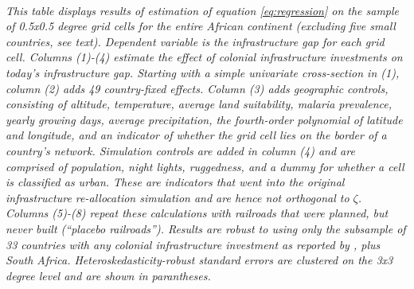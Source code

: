 \documentclass[11pt, oneside]{article}   	%
\begin{document}
\begin{table}[]
{}

\justify
\textit{\\ \footnotesize This table displays results of estimation of equation \eqref{eq:regression} on the sample of 0.5x0.5 degree grid cells for the entire African continent (excluding five small countries, see text). Dependent variable is the infrastructure gap for each grid cell. Columns (1)-(4) estimate the effect of colonial infrastructure investments on today's infrastructure gap. Starting with a simple univariate cross-section in (1), column (2) adds 49 country-fixed effects. Column (3) adds geographic controls, consisting of altitude, temperature, average land suitability, malaria prevalence, yearly growing days, average precipitation, the fourth-order polynomial of latitude and longitude, and an indicator of whether the grid cell lies on the border of a country's network. Simulation controls are added in column (4) and are comprised of population, night lights, ruggedness, and a dummy for whether a cell is classified as urban. These are indicators that went into the original infrastructure re-allocation simulation and are hence not orthogonal to $\zeta$. Columns (5)-(8) repeat these calculations with railroads that were planned, but never built (``placebo railroads''). Results are robust to using only the subsample of 33 countries with any colonial infrastructure investment as reported by \cite{jedwab_permanent_2016}, plus South Africa. Heteroskedasticity-robust standard errors are clustered on the 3x3 degree level and are shown in parantheses.}
\end{table}
\end{document}
